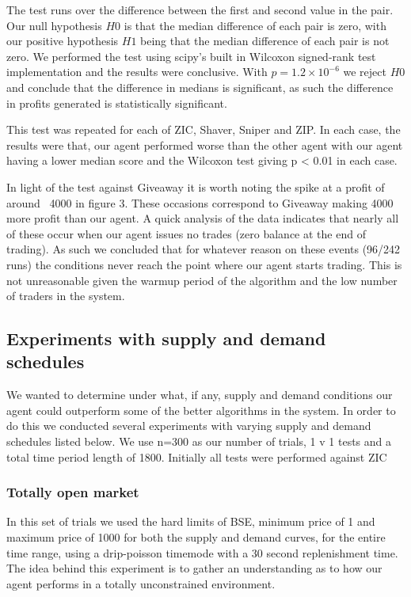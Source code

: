 \documentclass{acm_proc_article-sp}
\begin{document}
The test runs over the difference between the first and second value in the
pair. Our null hypothesis $H0$ is that the median difference of each pair is
zero, with our positive hypothesis $H1$ being that the median difference of
each pair is not zero. We performed the test using scipy's built in Wilcoxon
signed-rank test implementation\cite{scipy:wilcoxon} and the results were
conclusive.  With $p=1.2\times10^{-6}$ we reject $H0$ and conclude
that the difference in medians is significant, as such the difference in
profits generated is statistically significant.

This test was repeated for each of ZIC, Shaver, Sniper and ZIP. In each case,
the results were that, our agent performed worse than the other
agent with our agent having a lower median score and the Wilcoxon test giving
p < 0.01 in each case.

In light of the test against Giveaway it is  worth noting the spike at a profit
of around ~4000 in figure 3.  These occasions correspond to Giveaway making
4000 more profit than our agent. A quick analysis of the data indicates that
nearly all of these occur when our agent issues no trades (zero balance at the
end of trading). As such we concluded that for whatever reason on these events
(96/242 runs) the conditions never reach the point where our agent starts
trading. This is not unreasonable given the warmup period of the algorithm and
the low number of traders in the system.

\subsection{Experiments with supply and demand schedules}

We wanted to determine under what, if any, supply and demand conditions our
agent could outperform some of the better algorithms in the system. In order to
do this we conducted several experiments with varying supply and demand
schedules listed below. We use n=300 as our number of trials, 1 v 1 tests and a
total time period length of 1800. Initially all tests were performed against
ZIC

\subsubsection{Totally open market}

In this set of trials we used the hard limits of BSE, minimum price of 1 and
maximum price of 1000 for both the supply and demand curves, for the entire
time range, using a drip-poisson timemode with a 30 second replenishment time.
The idea behind this experiment is to gather an understanding as to how our
agent performs in a totally unconstrained environment.
\end{document}
